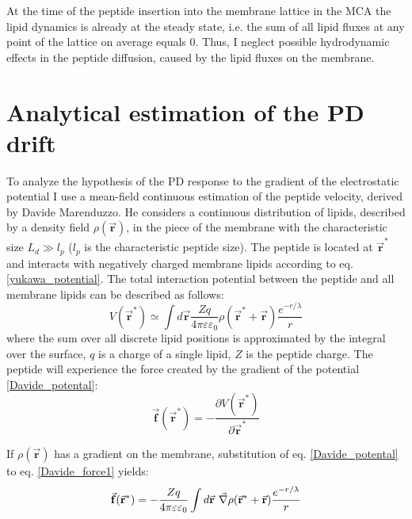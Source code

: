 At the time of the peptide insertion into the membrane lattice in the MCA the lipid dynamics is already at the steady state, i.e. the sum of all lipid fluxes at any point of the lattice on average equals 0. Thus, I neglect possible hydrodynamic effects in the peptide diffusion, caused by the lipid fluxes on the membrane.

\section{Analytical estimation of the PD drift}

\label{peptide_velocity_estimation}

To analyze the hypothesis of the PD response to the gradient of the electrostatic potential I use a mean-field continuous estimation of the peptide velocity, derived by Davide Marenduzzo. He considers a continuous distribution of lipids, described by a density field $\rho(\vec{\mathbf{r}})$, in the piece of the membrane with the characteristic size $L_d\gg l_p$ ($l_p$ is the characteristic peptide size). The peptide is located at $\vec{\mathbf{r}}^*$ and interacts with negatively charged membrane lipids according to eq. \eqref{yukawa_potential}. The total interaction potential between the peptide and all membrane lipids can be described as follows:
\begin{equation}
\label{Davide_potental}
 V(\vec{\mathbf{r}}^*) \simeq \int d\vec{\mathbf{r}}\frac{Zq}{4\pi\varepsilon\varepsilon_0} \rho(\vec{\mathbf{r}}^*+\vec{\mathbf{r}})\frac{e^{-r/\lambda}}{r}
\end{equation}
where the sum over all discrete lipid positions is approximated by the integral over the surface, $q$ is a charge of a single lipid, $Z$ is the peptide charge. The peptide will experience the force created by the gradient of the potential \eqref{Davide_potental}:
\begin{equation}
\label{Davide_force1}
 \vec{\mathbf{f}}(\vec{\mathbf{r}}^*) = -\frac{\partial V(\vec{\mathbf{r}}^*)}{\partial \vec{\mathbf{r}}^*}
\end{equation}

If $\rho(\vec{\mathbf{r}})$ has a gradient on the membrane, substitution of eq. \eqref{Davide_potental} to eq. \eqref{Davide_force1} yields:
\begin{equation}
\label{Davide_force2}
 \vec{\mathbf{f}}(\vec{\mathbf{r}}^*) = -\frac{Zq}{4\pi\varepsilon\varepsilon_0} \int d\vec{\mathbf{r}} \hspace{0.05in} \vec{\mathbf{\nabla}}\rho(\vec{\mathbf{r}}^*+\vec{\mathbf{r}})\frac{e^{-r/\lambda}}{r}
\end{equation}


